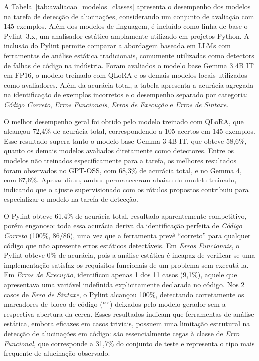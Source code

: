 \documentclass[conference]{IEEEtran}
\begin{document}
A Tabela~\ref{tab:avaliacao_modelos_classes} apresenta o desempenho dos modelos na tarefa de detecção de alucinações, considerando um conjunto de avaliação com 145 exemplos. Além dos modelos de linguagem, é incluído como linha de base o Pylint~3.x, um analisador estático amplamente utilizado em projetos Python. A inclusão do Pylint permite comparar a abordagem baseada em LLMs com ferramentas de análise estática tradicionais, comumente utilizadas como detectors de falhas de código na indústria. Foram avaliados o modelo base Gemma 3 4B IT em FP16, o modelo treinado com QLoRA e os demais modelos locais utilizados como avaliadores. Além da acurácia total, a tabela apresenta a acurácia agregada na identificação de exemplos incorretos e o desempenho separado por categoria: \emph{Código Correto}, \emph{Erros Funcionais}, \emph{Erros de Execução} e \emph{Erros de Sintaxe}.

O melhor desempenho geral foi obtido pelo modelo treinado com QLoRA, que alcançou 72{,}4\% de acurácia total, correspondendo a 105 acertos em 145 exemplos. Esse resultado supera tanto o modelo base Gemma 3 4B IT, que obteve 58{,}6\%, quanto os demais modelos avaliados diretamente como detectores. Entre os modelos não treinados especificamente para a tarefa, os melhores resultados foram observados no GPT-OSS, com 68{,}3\% de acurácia total, e no Gemma 4, com 67{,}6\%. Apesar disso, ambos permaneceram abaixo do modelo treinado, indicando que o ajuste supervisionado com os rótulos propostos contribuiu para especializar o modelo na tarefa de detecção.

O Pylint obteve 61{,}4\% de acurácia total, resultado aparentemente competitivo, porém enganoso: toda essa acurácia deriva da identificação perfeita de \emph{Código Correto} (100\%, 86/86), uma vez que a ferramenta prevê ``correto'' para qualquer código que não apresente erros estáticos detectáveis. Em \emph{Erros Funcionais}, o Pylint obteve 0\% de acurácia, pois a análise estática é incapaz de verificar se uma implementação satisfaz os requisitos funcionais de um problema sem executá-la. Em \emph{Erros de Execução}, identificou apenas 1 dos 11 casos (9{,}1\%), aquele que apresentava uma variável indefinida explicitamente declarada no código. Nos 2 casos de \emph{Erro de Sintaxe}, o Pylint alcançou 100\%, detectando corretamente os marcadores de bloco de código (\texttt{```}) deixados pelo modelo gerador sem a respectiva abertura da cerca. Esses resultados indicam que ferramentas de análise estática, embora eficazes em casos triviais, possuem uma limitação estrutural na detecção de alucinações em código: são essencialmente cegas à classe de \emph{Erro Funcional}, que corresponde a 31{,}7\% do conjunto de teste e representa o tipo mais frequente de alucinação observado.
\end{document}
